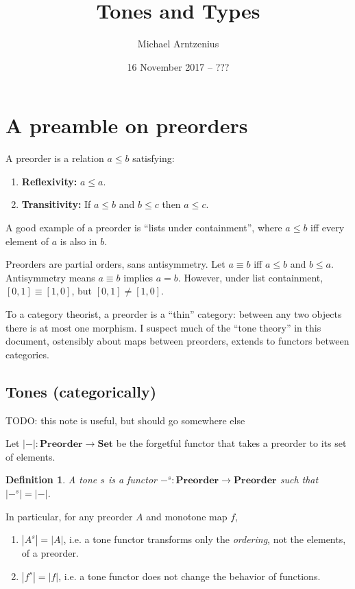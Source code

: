 \documentclass{rntznotes}
\title{Tones and Types}
\author{Michael Arntzenius}
\date{16 November 2017 -- ???}
\newtheorem{definition}{Definition}
\newcommand{\todo}[1]{{\color{red}#1}}
\newcommand{\mb}[1]{\ensuremath{\mathbf{#1}}}
\newcommand{\mc}[1]{\ensuremath{\mathcal{#1}}}
\begin{document}
\maketitle

\section{A preamble on preorders}

A preorder is a relation $a \le b$ satisfying:
\begin{enumerate}
\item \textbf{Reflexivity:} $a \le a$.
\item \textbf{Transitivity:} If $a \le b$ and $b \le c$ then $a \le c$.
\end{enumerate}

A good example of a preorder is ``lists under containment'', where $a \le b$ iff
every element of $a$ is also in $b$.

Preorders are partial orders, sans antisymmetry. Let $a \equiv b$ iff $a \le b$
and $b \le a$. Antisymmetry means $a \equiv b$ implies $a = b$. However, under
list containment, $[0,1] \equiv [1,0]$, but $[0,1] \ne [1,0]$.

To a category theorist, a preorder is a ``thin'' category: between any two
objects there is at most one morphism. I suspect much of the ``tone theory'' in
this document, ostensibly about maps between preorders, extends to functors
between categories.



\subsection{Tones (categorically)}

\todo{TODO: this note is useful, but should go somewhere else}

\newcommand{\elemset}[1]{\ensuremath{\mc{U}({#1})}}
\newcommand{\elemsetfn}[0]{\mc{U}}
\renewcommand{\elemset}[1]{\ensuremath{|{#1}|}}
\renewcommand{\elemsetfn}[0]{\elemset{-}}

Let $\elemsetfn{} : \mb{Preorder} \to \mb{Set}$ be the forgetful functor that
takes a preorder to its set of elements.

\begin{definition}
  A tone $s$ is a functor $-^s : \mb{Preorder} \to \mb{Preorder}$ such that
  $\elemset{-^s} = \elemsetfn$.
\end{definition}

In particular, for any preorder $A$ and monotone map $f$,
\begin{enumerate}
\item $|A^s| = |A|$, i.e. a tone functor transforms only the \emph{ordering},
  not the elements, of a preorder.
\item $|f^s| = |f|$, i.e. a tone functor does not change the behavior of
  functions.
\end{enumerate}
\end{document}
